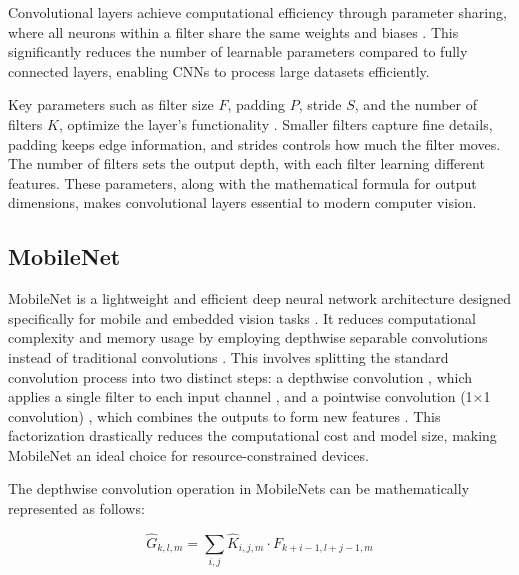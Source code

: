 Convolutional layers achieve computational efficiency through parameter sharing, where all neurons within a filter share the same weights and biases \cite{cs231n_cnn}. This significantly reduces the number of learnable parameters compared to fully connected layers, enabling CNNs to process large datasets efficiently.

Key parameters such as filter size \(F\), padding \(P\), stride \(S\), and the number of filters \(K\), optimize the layer's functionality \cite{cs231n_cnn}. Smaller filters capture fine details, padding keeps edge information, and strides controls how much the filter moves. The number of filters sets the output depth, with each filter learning different features. These parameters, along with the mathematical formula for output dimensions, makes convolutional layers essential to modern computer vision.





\subsection{MobileNet}

MobileNet is a lightweight and efficient deep neural network architecture designed specifically for mobile and embedded vision tasks \cite{howard2017mobilenetsefficientconvolutionalneural}. It reduces computational complexity and memory usage by employing depthwise separable convolutions instead of traditional convolutions \cite{howard2017mobilenetsefficientconvolutionalneural}. This involves splitting the standard convolution process into two distinct steps: a depthwise convolution , which applies a single filter to each input channel , and a pointwise convolution (1×1 convolution) , which combines the outputs to form new features \cite{howard2017mobilenetsefficientconvolutionalneural}. This factorization drastically reduces the computational cost and model size, making MobileNet an ideal choice for resource-constrained devices.

The depthwise convolution operation in MobileNets can be mathematically represented as follows:

\begin{equation}
    \hat{G}_{k,l,m} = \sum_{i,j} \hat{K}_{i,j,m} \cdot F_{k+i-1,l+j-1,m}
\end{equation}



